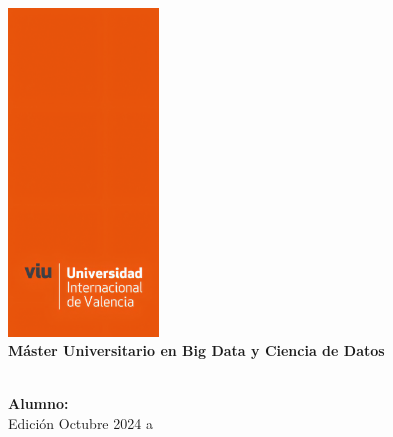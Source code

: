 \thispagestyle{empty}
\begin{center}
    \vspace*{-4.2cm} %
    \includegraphics[width=0.3\textwidth]{assets/images/VIU-Title.png}\\[1cm] %
    \vspace*{1cm}
    \textbf{\LARGE Máster Universitario en Big Data y Ciencia de Datos}\\[0.5cm]
    \textit{\MakeUppercase{\mytitle}}\\[2cm]
    \vspace*{3cm}
    \begin{flushleft}
        \textbf{Alumno:} \textit{\MakeUppercase{\myauthor}}\\[0.5cm]
        Edición Octubre 2024 a \textbf{\mydate}
    \end{flushleft}
\end{center}
\pagebreak

